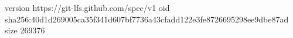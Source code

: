 version https://git-lfs.github.com/spec/v1
oid sha256:40d1d269005ca35f341d607bf7736a43cfadd122e3fe8726695298ee9dbe87ad
size 269376
